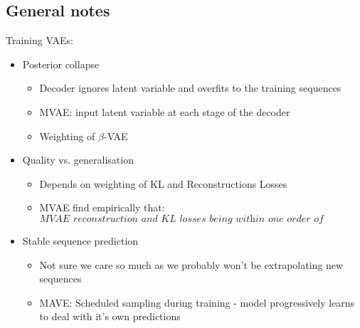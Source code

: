 \subsection{General notes}
Training VAEs:
\begin{itemize}
    \item Posterior collapse
    \begin{itemize}
        \item Decoder ignores latent variable and overfits to the training sequences
        \item MVAE: input latent variable at each stage of the decoder
        \item Weighting of $\beta$-VAE
    \end{itemize}
    \item Quality vs. generalisation
    \begin{itemize}
        \item Depends on weighting of KL and Reconstructions Losses
        \item MVAE find empirically that: $\textit{MVAE reconstruction and KL losses being within one order of magnitude of eachother is a good proxy to balance}$
    \end{itemize}
    \item Stable sequence prediction
    \begin{itemize}
        \item Not sure we care so much as we probably won't be extrapolating new sequences
        \item MAVE: Scheduled sampling during training - model progressively learns to deal with it's own predictions
    \end{itemize}
\end{itemize}